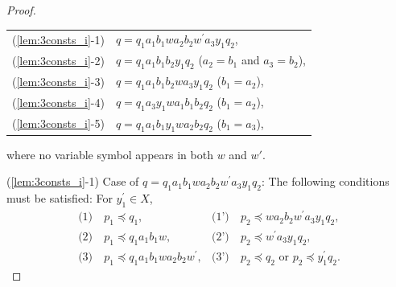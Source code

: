 \begin{proof}
\begin{tabular}{ll}
(\ref{lem:3consts_i}-1) & $q=q_{1}a_{1}b_{1}wa_{2}b_{2}w^{\prime}a_{3}y_{1}q_{2}$,\\
(\ref{lem:3consts_i}-2) & $q=q_{1}a_{1}b_{1}b_{2}y_{1}q_{2}$ ($a_{2}=b_{1}$ and $a_{3}=b_{2}$),\\
(\ref{lem:3consts_i}-3) & $q=q_{1}a_{1}b_{1}b_{2}wa_{3}y_{1}q_{2}$ ($b_{1}=a_{2}$),\\
(\ref{lem:3consts_i}-4) & $q=q_{1}a_{3}y_{1}wa_{1}b_{1}b_{2}q_{2}$ ($b_{1}=a_{2}$),\\
(\ref{lem:3consts_i}-5) & $q=q_{1}a_{1}b_{1}y_{1}wa_{2}b_{2}q_{2}$ ($b_{1}=a_{3}$),
\end{tabular}

\noindent
where no variable symbol appears in both $w$ and $w'$.

\smallskip
\noindent
(\ref{lem:3consts_i}-1) Case of $q=q_{1}a_{1}b_{1}wa_{2}b_{2}w^{\prime}a_{3}y_{1}q_{2}$:
The following conditions must be satisfied: For $y_{1}^{\prime}\in X$,
\begin{align*}
\textrm{(1)}~& p_{1} \preceq q_{1}, & \textrm{(1')}~& p_{2} \preceq wa_{2}b_{2}w^{\prime}a_{3}y_{1}q_{2}, \\
\textrm{(2)}~& p_{1} \preceq q_{1}a_{1}b_{1}w, & \textrm{(2')}~& p_{2} \preceq w^{\prime}a_{3}y_{1}q_{2}, \\
\textrm{(3)}~& p_{1} \preceq q_{1}a_{1}b_{1}wa_{2}b_{2}w^{\prime}, & \textrm{(3')}~& p_{2} \preceq q_{2} \mbox{~or~} p_{2} \preceq y_{1}^{\prime}q_{2}.
\end{align*}


\end{proof}
